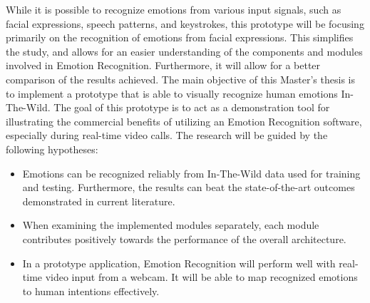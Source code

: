 While it is possible to recognize emotions from various input signals, such as facial expressions, speech patterns, and keystrokes, this prototype will be focusing primarily on the recognition of emotions from facial expressions. This simplifies the study, and allows for an easier understanding of the components and modules involved in Emotion Recognition. Furthermore, it will allow for a better comparison of the results achieved. 
\newline\newline
The main objective of this Master's thesis is to implement a prototype that is able to visually recognize human emotions In-The-Wild. The goal of this prototype is to act as a demonstration tool for illustrating the commercial benefits of utilizing an Emotion Recognition software, especially during real-time video calls. 
\newline\newline
The research will be guided by the following hypotheses: 
\begin{itemize}
    \item Emotions can be recognized reliably from In-The-Wild data used for training and testing. Furthermore, the results can beat the state-of-the-art outcomes demonstrated in current literature.
    \item When examining the implemented modules separately, each module contributes positively towards the performance of the overall architecture.
    \item In a prototype application, Emotion Recognition will perform well with real-time video input from a webcam. It will be able to map recognized emotions to human intentions effectively.

\end{itemize}


